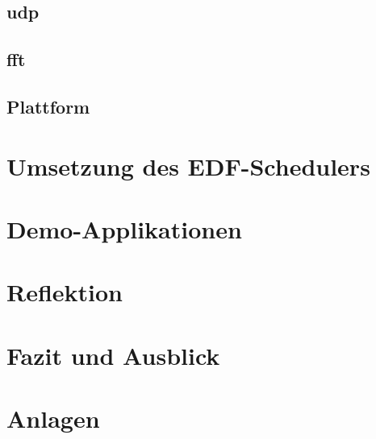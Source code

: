 \documentclass{scrartcl}
\begin{document}
		\subsection{\acf{udp}} \label{section:udp}
			
		\subsection{\acf{fft}} \label{section:fft}
			
		\clearpage
		\subsection{Plattform} \label{section:plattform}
			
	\clearpage
	\section{Umsetzung des EDF-Schedulers} \label{section:der_edf_scheduler}
		
	\clearpage
	\section{Demo-Applikationen} \label{section:demo_applikationen}
		
	\clearpage
	\section{Reflektion} \label{section:aufgetretene_probleme}
		
	\clearpage
	\section{Fazit und Ausblick} \label{section:fazit_und_ausblick}
		
	\newpage
	\printbibliography[heading=bibnumbered, title=Literaturverzeichnis]
	\clearpage
	\section{Anlagen} \label{section:anlagen}
		
\end{document}
